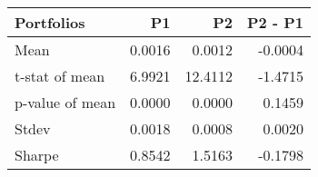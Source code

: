 \begin{tabular}{lrrr}
\toprule
Portfolios & P1 & P2 & P2 - P1 \\
\midrule
Mean & 0.0016 & 0.0012 & -0.0004 \\
t-stat of mean & 6.9921 & 12.4112 & -1.4715 \\
p-value of mean & 0.0000 & 0.0000 & 0.1459 \\
Stdev & 0.0018 & 0.0008 & 0.0020 \\
Sharpe & 0.8542 & 1.5163 & -0.1798 \\
\bottomrule
\end{tabular}
